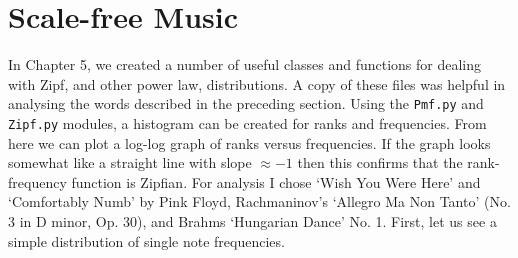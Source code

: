 \documentclass[10pt]{book}
\begin{document}
\section{Scale-free Music}
In Chapter 5, we created a number of useful classes and functions for dealing with Zipf, and other power law, distributions. A copy of these files was helpful in analysing the words described in the preceding section. Using the \texttt{Pmf.py} and \texttt{Zipf.py} modules, a histogram can be created for ranks and frequencies. From here we can plot a log-log graph of ranks versus frequencies. If the graph looks somewhat like a straight line with slope $\approx -1$ then this confirms that the rank-frequency function is Zipfian. For analysis I chose `Wish You Were Here' and `Comfortably Numb' by Pink Floyd, Rachmaninov's `Allegro Ma Non Tanto' (No. 3 in D minor, Op. 30), and Brahms `Hungarian Dance' No. 1. First, let us see a simple distribution of single note frequencies.
\end{document}
